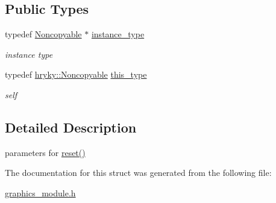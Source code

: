 \subsection*{Public Types}
\begin{DoxyCompactItemize}
\item 
\hypertarget{classhryky_1_1_noncopyable_aaf87abb55f700af85ecb0895f6178821}{typedef \hyperlink{classhryky_1_1_noncopyable}{Noncopyable} $\ast$ \hyperlink{classhryky_1_1_noncopyable_aaf87abb55f700af85ecb0895f6178821}{instance\-\_\-type}}\label{classhryky_1_1_noncopyable_aaf87abb55f700af85ecb0895f6178821}

\begin{DoxyCompactList}\small\item\em instance type \end{DoxyCompactList}\item 
\hypertarget{classhryky_1_1_noncopyable_acf13ad1c98a76247a561dff514979da5}{typedef \hyperlink{classhryky_1_1_noncopyable}{hryky\-::\-Noncopyable} \hyperlink{classhryky_1_1_noncopyable_acf13ad1c98a76247a561dff514979da5}{this\-\_\-type}}\label{classhryky_1_1_noncopyable_acf13ad1c98a76247a561dff514979da5}

\begin{DoxyCompactList}\small\item\em self \end{DoxyCompactList}\end{DoxyCompactItemize}


\subsection{Detailed Description}
parameters for \hyperlink{classhryky_1_1graphics_1_1_module_a5c8abe754f63338ef1f62392e93e3306}{reset()} 

The documentation for this struct was generated from the following file\-:\begin{DoxyCompactItemize}
\item 
\hyperlink{graphics__module_8h}{graphics\-\_\-module.\-h}\end{DoxyCompactItemize}
